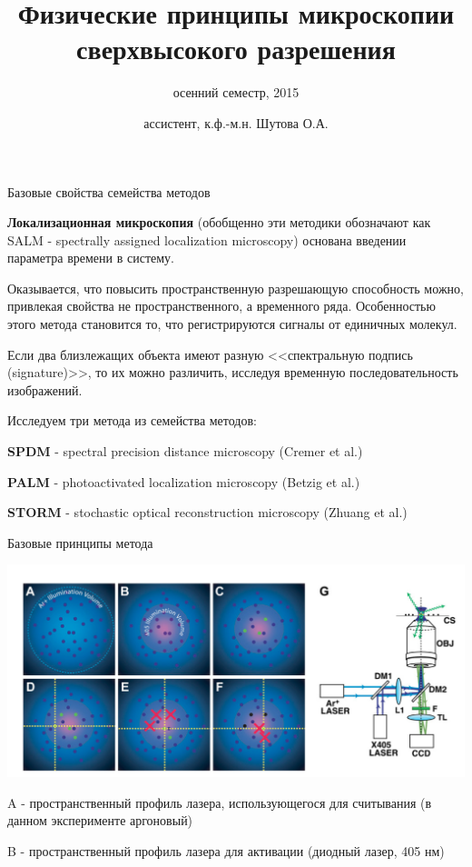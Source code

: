 \documentclass[9pt, compress, xcolor=table]{beamer}
\title{Физические принципы микроскопии сверхвысокого разрешения}
\subtitle{осенний семестр, 2015}
\author{ассистент, к.ф.-м.н. Шутова О.А.}
\institute{МГУ им. М.В. Ломоносова, физический факультет}
\begin{document}
\maketitle


\begin{frame}{Базовые свойства семейства методов}

\textcolor{red!50!black}{\textbf{Локализационная микроскопия}} (обобщенно эти методики обозначают как SALM - spectrally assigned localization microscopy) основана введении параметра времени в систему. 

Оказывается, что повысить пространственную разрешающую способность можно, привлекая свойства не пространственного, а временного ряда. Особенностью этого метода становится то, что регистрируются сигналы от единичных молекул. 

Если два близлежащих объекта имеют разную <<спектральную подпись (signature)>>, то их можно различить, исследуя временную последовательность изображений. 

Исследуем три метода из семейства методов: 

\textbf{SPDM} - spectral precision distance microscopy (Cremer et al.)

\textbf{PALM} - photoactivated localization microscopy (Betzig et al.)

\textbf{STORM} - stochastic optical reconstruction microscopy (Zhuang et al.)


\end{frame}

\begin{frame}{Базовые принципы метода}
\begin{center}
\includegraphics[width=\textwidth]{lm1}
\end{center}


A - пространственный профиль лазера, использующегося для считывания (в данном эксперименте аргоновый)

B - пространственный профиль лазера для активации (диодный лазер, 405 нм)
\end{frame}
\end{document}
